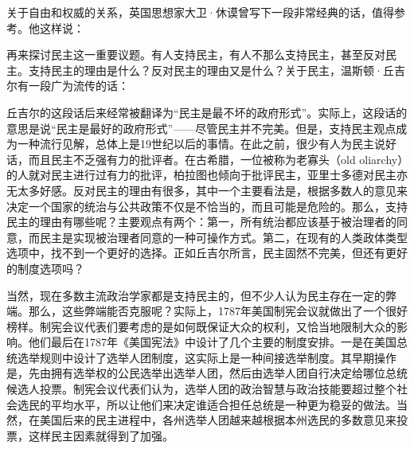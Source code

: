 关于自由和权威的关系，英国思想家大卫·休谟曾写下一段非常经典的话，值得参考。他这样说：


再来探讨民主这一重要议题。有人支持民主，有人不那么支持民主，甚至反对民主。支持民主的理由是什么？反对民主的理由又是什么？关于民主，温斯顿·丘吉尔有一段广为流传的话：


丘吉尔的这段话后来经常被翻译为“民主是最不坏的政府形式”。实际上，这段话的意思是说“民主是最好的政府形式”——尽管民主并不完美。但是，支持民主观点成为一种流行见解，总体上是19世纪以后的事情。在此之前，很少有人为民主说好话，而且民主不乏强有力的批评者。在古希腊，一位被称为老寡头（old oliarchy）的人就对民主进行过有力的批评，柏拉图也倾向于批评民主，亚里士多德对民主亦无太多好感。反对民主的理由有很多，其中一个主要看法是，根据多数人的意见来决定一个国家的统治与公共政策不仅是不恰当的，而且可能是危险的。那么，支持民主的理由有哪些呢？主要观点有两个：第一，所有统治都应该基于被治理者的同意，而民主是实现被治理者同意的一种可操作方式。第二，在现有的人类政体类型选项中，找不到一个更好的选择。正如丘吉尔所言，民主固然不完美，但还有更好的制度选项吗？

当然，现在多数主流政治学家都是支持民主的，但不少人认为民主存在一定的弊端。那么，这些弊端能否克服呢？实际上，1787年美国制宪会议就做出了一个很好榜样。制宪会议代表们要考虑的是如何既保证大众的权利，又恰当地限制大众的影响。他们最后在1787年《美国宪法》中设计了几个主要的制度安排。一是在美国总统选举规则中设计了选举人团制度，这实际上是一种间接选举制度。其早期操作是，先由拥有选举权的公民选举出选举人团，然后由选举人团自行决定给哪位总统候选人投票。制宪会议代表们认为，选举人团的政治智慧与政治技能要超过整个社会选民的平均水平，所以让他们来决定谁适合担任总统是一种更为稳妥的做法。当然，在美国后来的民主进程中，各州选举人团越来越根据本州选民的多数意见来投票，这样民主因素就得到了加强。


